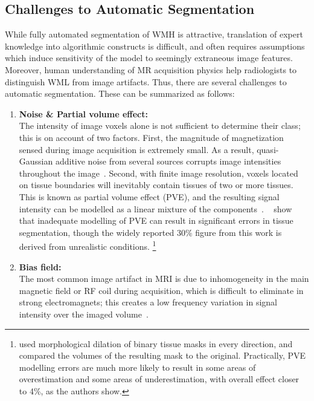 \subsection{Challenges to Automatic Segmentation}\label{ss:autochallenges}
While fully automated segmentation of WMH is attractive,
translation of expert knowledge into algorithmic constructs is difficult, and often requires
assumptions which induce sensitivity of the model to seemingly extraneous image features.
Moreover, human understanding of MR acquisition physics
help radiologists to distinguish WML from image artifacts.
Thus, there are several challenges to automatic segmentation.
These can be summarized as follows:
\begin{enumerate}[itemsep=0pt,topsep=0pt]
  \item\label{chauto:npva}
    \textbf{Noise \& Partial volume effect:}\\
    The intensity of image voxels alone is not sufficient to determine their class;
    this is on account of two factors.
    First, the magnitude of magnetization sensed during image acquisition is extremely small.
    As a result, quasi-Gaussian additive noise from several sources
    corrupts image intensities throughout the image~\cite{Dietrich2008a}.
    Second, with finite image resolution,
    voxels located on tissue boundaries will inevitably contain tissues of two or more tissues.
    This is known as partial volume effect (PVE), and the resulting signal intensity
    can be modelled as a linear mixture of the components~\cite{Santago1995,Khademi2014}.
    \citeauthor{Niessen1999}~\cite{Niessen1999} show that inadequate modelling of PVE
    can result in significant errors in tissue segmentation,
    though the widely reported 30\% figure from this work is derived from unrealistic conditions.%
    \footnote{\citeauthor{Niessen1999} used morphological dilation of binary tissue masks %
    in every direction, and compared the volumes of the resulting mask to the original.
    Practically, PVE modelling errors are much more likely to result in
    some areas of overestimation and some areas of underestimation,
    with overall effect closer to 4\%, as the authors show.}
  \item\label{chauto:bias}
  \textbf{Bias field:}\\
    The most common image artifact in MRI is due to
    inhomogeneity in the main magnetic field or RF coil during acquisition,
    which is difficult to eliminate in strong electromagnets; this creates
    a low frequency variation in signal intensity over the imaged volume~\cite{Juntu2005,Vovk2007}.

\end{enumerate}

